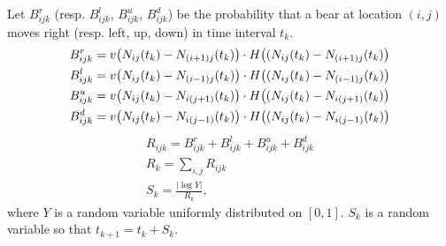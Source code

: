 \documentclass{article}
\let\originalleft\left
\let\originalright\right
\renewcommand{\left}{\mathopen{}\mathclose\bgroup\originalleft}
\renewcommand{\right}{\aftergroup\egroup\originalright}
\begin{document}
Let $B_{ijk}^r$ (resp. $B_{ijk}^l$, $B_{ijk}^u$, $B_{ijk}^d$) be the probability that a bear at location $(i,j)$ moves right (resp. left, up, down) in time interval $t_k$. 
\begin{align}
  B_{ijk}^r&= v \left( N_{ij}(t_k)-N_{(i+1)j}(t_k)\right)\cdot H\left((N_{ij}(t_k)-N_{(i+1)j}(t_k)\right) \\
  B_{ijk}^l&= v \left( N_{ij}(t_k)-N_{(i-1)j}(t_k)\right)\cdot H\left((N_{ij}(t_k)-N_{(i-1)j}(t_k)\right) \\
  B_{ijk}^u&= v \left( N_{ij}(t_k)-N_{i(j+1)}(t_k)\right)\cdot H\left((N_{ij}(t_k)-N_{i(j+1)}(t_k)\right) \\
  B_{ijk}^d&= v \left( N_{ij}(t_k)-N_{i(j-1)}(t_k)\right)\cdot H\left((N_{ij}(t_k)-N_{i(j-1)}(t_k)\right)
\end{align}
\begin{align}
  R_{ijk}=B_{ijk}^r+B_{ijk}^l+B_{ijk}^u+B_{ijk}^d \\
  R_k = \sum_{i,j} R_{ijk} \\
  S_k =\frac{|\log Y|}{R_k},
\end{align}
where $Y$ is a random variable uniformly distributed on $[0,1]$. $S_k$ is a random variable so that $t_{k+1} = t_k + S_k$.
\end{document}
